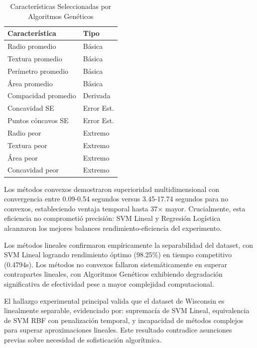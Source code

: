 \documentclass[conference]{IEEEtran}
\begin{document}
\begin{table}[htbp]
\caption{Características Seleccionadas por Algoritmos Genéticos}
\begin{center}
\footnotesize
\begin{tabular}{|l|l|}
\hline
\textbf{Característica} & \textbf{Tipo} \\
\hline
Radio promedio & Básica \\
\hline
Textura promedio & Básica \\
\hline
Perímetro promedio & Básica \\
\hline
Área promedio & Básica \\
\hline
Compacidad promedio & Derivada \\
\hline
Concavidad SE & Error Est. \\
\hline
Puntos cóncavos SE & Error Est. \\
\hline
Radio peor & Extremo \\
\hline
Textura peor & Extremo \\
\hline
Área peor & Extremo \\
\hline
Concavidad peor & Extremo \\
\hline
\end{tabular}
\label{tab4}
\end{center}
\end{table}


Los métodos convexos demostraron superioridad multidimensional con convergencia entre 0.09-0.54 segundos versus 3.45-17.74 segundos para no convexos, estableciendo ventaja temporal hasta 37$\times$ mayor. Crucialmente, esta eficiencia no comprometió precisión: SVM Lineal y Regresión Logística alcanzaron los mejores balances rendimiento-eficiencia del experimento.

Los métodos lineales confirmaron empíricamente la separabilidad del dataset, con SVM Lineal logrando rendimiento óptimo (98.25\%) en tiempo competitivo (0.4794s). Los métodos no convexos fallaron sistemáticamente en superar contrapartes lineales, con Algoritmos Genéticos exhibiendo degradación significativa de efectividad pese a mayor complejidad computacional.

El hallazgo experimental principal valida que el dataset de Wisconsin es linealmente separable, evidenciado por: supremacía de SVM Lineal, equivalencia de SVM RBF con penalización temporal, y incapacidad de métodos complejos para superar aproximaciones lineales. Este resultado contradice asunciones previas sobre necesidad de sofisticación algorítmica.
\end{document}
